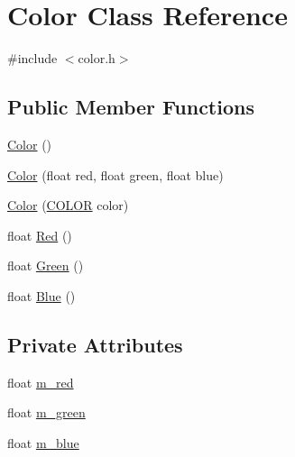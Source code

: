 \hypertarget{classColor}{\section{Color Class Reference}
\label{classColor}
}


{\ttfamily \#include $<$color.\-h$>$}

\subsection*{Public Member Functions}
\begin{DoxyCompactItemize}
\item 
\hyperlink{classColor_a9a742cbe9f9f4037f5d9f4e81a9b2428}{Color} ()
\item 
\hyperlink{classColor_aa347facf3fa618a4817f94bef0c5d424}{Color} (float red, float green, float blue)
\item 
\hyperlink{classColor_a0a169e5ff7cc17872c3f21d652b02497}{Color} (\hyperlink{color_8h_af90824509586333cf45ce757d2711ce3}{C\-O\-L\-O\-R} color)
\item 
float \hyperlink{classColor_ae212502d1420f4b935dad02b9b17131a}{Red} ()
\item 
float \hyperlink{classColor_a6fac5c8fc1822b01d2f5500ba906eb6e}{Green} ()
\item 
float \hyperlink{classColor_a9bba5de22a953eb924173eb1c207f667}{Blue} ()
\end{DoxyCompactItemize}
\subsection*{Private Attributes}
\begin{DoxyCompactItemize}
\item 
float \hyperlink{classColor_a6da1cc1b1358e18dce5fc0335a8abdb6}{m\-\_\-red}
\item 
float \hyperlink{classColor_a6c884c0a93f4e23c5db71d003ec2857a}{m\-\_\-green}
\item 
float \hyperlink{classColor_a68e36f358a0d335e9a7cadd748cb67b5}{m\-\_\-blue}
\end{DoxyCompactItemize}



